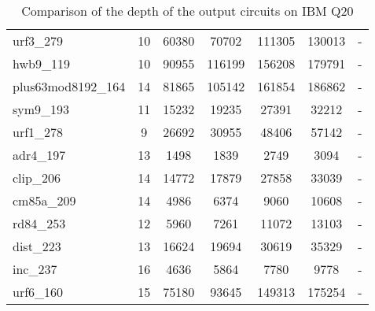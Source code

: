 \documentclass[journal]{IEEEtran}
\begin{document}
\begin{table*}[!th]
\begin{center}
\begin{tabular}{|p{4.3cm}<{\centering}|c|c|c|c|c|c|}
urf3\_279 & 10 & 60380 & 70702 & 111305 & 130013 & - \\ 
hwb9\_119 & 10 & 90955 & 116199 & 156208 & 179791 & - \\ 
plus63mod8192\_164 & 14 & 81865 & 105142 & 161854 & 186862 & - \\ 
sym9\_193 & 11 & 15232 & 19235 & 27391 & 32212 & - \\ 
urf1\_278 & 9 & 26692 & 30955 & 48406 & 57142 & - \\ 
adr4\_197 & 13 & 1498 & 1839 & 2749 & 3094 & - \\ 
clip\_206 & 14 & 14772 & 17879 & 27858 & 33039 & - \\ 
cm85a\_209 & 14 & 4986 & 6374 & 9060 & 10608 & - \\ 
rd84\_253 & 12 & 5960 & 7261 & 11072 & 13103 & - \\ 
dist\_223 & 13 & 16624 & 19694 & 30619 & 35329 & - \\ 
inc\_237 & 16 & 4636 & 5864 & 7780 & 9778 & - \\ 
urf6\_160 & 15 & 75180 & 93645 & 149313 & 175254 & - \\
                           \hline
                          
                    \end{tabular} 
                  \end{center}					
                    \caption{Comparison of  the depth of the output circuits on  IBM Q20} 
                    \label{tab8}
                \end{table*}	
\end{document}
